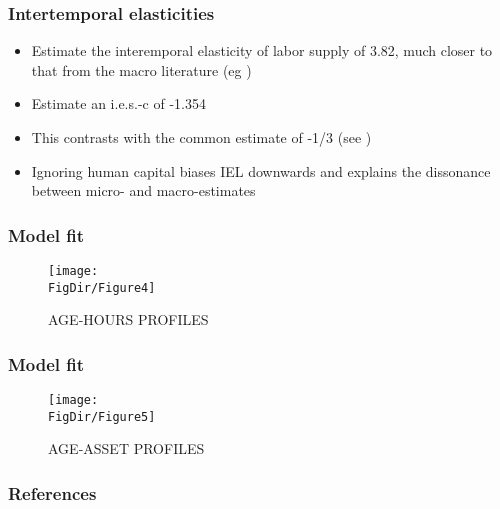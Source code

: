 \documentclass{beamer}
\begin{document}
        \begin{frame}
    \frametitle{Intertemporal elasticities}
      \begin{itemize}
      \item Estimate the interemporal elasticity of labor supply of 3.82, much closer to that from the macro literature (eg \cite{Eichenbaum1988-kg})
      \item  Estimate an i.e.s.-c of -1.354
      \item This contrasts with the common estimate of -1/3 (see \cite{Hubbard1994-qp})
      \item Ignoring human capital biases IEL downwards and explains the dissonance between micro- and macro-estimates
    \end{itemize}
  \end{frame}

      \begin{frame}
      \frametitle{Model fit}
      \begin{figure}[tbp]
        \centerline{\texttt{[image: \\FigDir/Figure4]}}
  \caption{AGE-HOURS PROFILES}
  \label{fig:AgeHoursProfiles}
      \end{figure}
    \end{frame}

          \begin{frame}
      \frametitle{Model fit}
      \begin{figure}[tbp]
        \centerline{\texttt{[image: \\FigDir/Figure5]}}
  \caption{AGE-ASSET PROFILES}
  \label{fig:AgeAssetProfiles}
      \end{figure}
          \end{frame}

          \begin{frame}[allowframebreaks]
            \frametitle{References}
            \printbibliography
            \end{frame}
          
  
\end{document}
